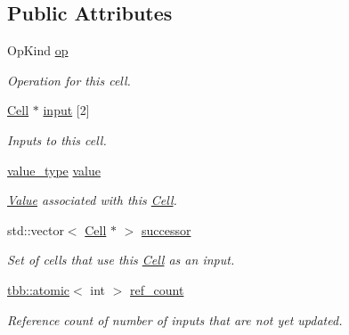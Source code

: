 \subsection*{Public Attributes}
\begin{DoxyCompactItemize}
\item 
\hypertarget{classCell_afc40fac9dd735398ba80e9087746f454}{}Op\+Kind \hyperlink{classCell_afc40fac9dd735398ba80e9087746f454}{op}\label{classCell_afc40fac9dd735398ba80e9087746f454}

\begin{DoxyCompactList}\small\item\em Operation for this cell. \end{DoxyCompactList}\item 
\hypertarget{classCell_aa8f62b49f5e42811ffd4fcde92bdac36}{}\hyperlink{classCell}{Cell} $\ast$ \hyperlink{classCell_aa8f62b49f5e42811ffd4fcde92bdac36}{input} \mbox{[}2\mbox{]}\label{classCell_aa8f62b49f5e42811ffd4fcde92bdac36}

\begin{DoxyCompactList}\small\item\em Inputs to this cell. \end{DoxyCompactList}\item 
\hypertarget{classCell_a39fe0b627fbfa257a307434b576822c3}{}\hyperlink{classCell_a10efbda08c279c3b66d62b7da19b49b9}{value\+\_\+type} \hyperlink{classCell_a39fe0b627fbfa257a307434b576822c3}{value}\label{classCell_a39fe0b627fbfa257a307434b576822c3}

\begin{DoxyCompactList}\small\item\em \hyperlink{structValue}{Value} associated with this \hyperlink{classCell}{Cell}. \end{DoxyCompactList}\item 
\hypertarget{classCell_a7b5f415e6e72bc5e34ab0627eae6d8cd}{}std\+::vector$<$ \hyperlink{classCell}{Cell} $\ast$ $>$ \hyperlink{classCell_a7b5f415e6e72bc5e34ab0627eae6d8cd}{successor}\label{classCell_a7b5f415e6e72bc5e34ab0627eae6d8cd}

\begin{DoxyCompactList}\small\item\em Set of cells that use this \hyperlink{classCell}{Cell} as an input. \end{DoxyCompactList}\item 
\hypertarget{classCell_a2b6e15c5e6bb48e3de9d1a55a5b401b9}{}\hyperlink{structtbb_1_1atomic}{tbb\+::atomic}$<$ int $>$ \hyperlink{classCell_a2b6e15c5e6bb48e3de9d1a55a5b401b9}{ref\+\_\+count}\label{classCell_a2b6e15c5e6bb48e3de9d1a55a5b401b9}

\begin{DoxyCompactList}\small\item\em Reference count of number of inputs that are not yet updated. \end{DoxyCompactList}\end{DoxyCompactItemize}


